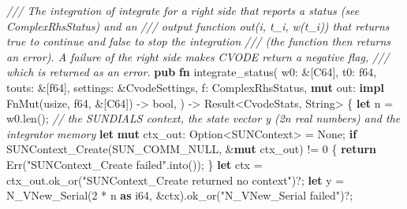 \documentclass[
  10pt,
]{article}
\newenvironment{Shaded}{}{}
\newcommand{\BuiltInTok}[1]{\textcolor[rgb]{0.00,0.50,0.00}{#1}}
\newcommand{\CommentTok}[1]{\textcolor[rgb]{0.38,0.63,0.69}{\textit{#1}}}
\newcommand{\ConstantTok}[1]{\textcolor[rgb]{0.53,0.00,0.00}{#1}}
\newcommand{\ControlFlowTok}[1]{\textcolor[rgb]{0.00,0.44,0.13}{\textbf{#1}}}
\newcommand{\DataTypeTok}[1]{\textcolor[rgb]{0.56,0.13,0.00}{#1}}
\newcommand{\DecValTok}[1]{\textcolor[rgb]{0.25,0.63,0.44}{#1}}
\newcommand{\KeywordTok}[1]{\textcolor[rgb]{0.00,0.44,0.13}{\textbf{#1}}}
\newcommand{\NormalTok}[1]{#1}
\newcommand{\OperatorTok}[1]{\textcolor[rgb]{0.40,0.40,0.40}{#1}}
\newcommand{\StringTok}[1]{\textcolor[rgb]{0.25,0.44,0.63}{#1}}
\begin{document}
\begin{Shaded}
\begin{Highlighting}[]
\CommentTok{/// The integration of \textasciigrave{}integrate\textasciigrave{} for a right side that reports a status (see \textasciigrave{}ComplexRhsStatus\textasciigrave{}) and an}
\CommentTok{/// output function \textasciigrave{}out(i, t\_i, w(t\_i))\textasciigrave{} that returns true to continue and false to stop the integration}
\CommentTok{/// (the function then returns an error).  A failure of the right side makes CVODE return a negative flag,}
\CommentTok{/// which is returned as an error.}
\KeywordTok{pub} \KeywordTok{fn}\NormalTok{ integrate\_status(}
\NormalTok{    w0}\OperatorTok{:} \OperatorTok{\&}\NormalTok{[C64]}\OperatorTok{,}
\NormalTok{    t0}\OperatorTok{:} \DataTypeTok{f64}\OperatorTok{,}
\NormalTok{    touts}\OperatorTok{:} \OperatorTok{\&}\NormalTok{[}\DataTypeTok{f64}\NormalTok{]}\OperatorTok{,}
\NormalTok{    settings}\OperatorTok{:} \OperatorTok{\&}\NormalTok{CvodeSettings}\OperatorTok{,}
\NormalTok{    f}\OperatorTok{:}\NormalTok{ ComplexRhsStatus}\OperatorTok{,}
    \KeywordTok{mut}\NormalTok{ out}\OperatorTok{:} \KeywordTok{impl} \BuiltInTok{FnMut}\NormalTok{(}\DataTypeTok{usize}\OperatorTok{,} \DataTypeTok{f64}\OperatorTok{,} \OperatorTok{\&}\NormalTok{[C64]) }\OperatorTok{{-}\textgreater{}} \DataTypeTok{bool}\OperatorTok{,}
\NormalTok{) }\OperatorTok{{-}\textgreater{}} \DataTypeTok{Result}\OperatorTok{\textless{}}\NormalTok{CvodeStats}\OperatorTok{,} \DataTypeTok{String}\OperatorTok{\textgreater{}} \OperatorTok{\{}
    \KeywordTok{let}\NormalTok{ n }\OperatorTok{=}\NormalTok{ w0}\OperatorTok{.}\NormalTok{len()}\OperatorTok{;}
    \CommentTok{// the SUNDIALS context, the state vector y (2n real numbers) and the integrator memory}
    \KeywordTok{let} \KeywordTok{mut}\NormalTok{ ctx\_out}\OperatorTok{:} \DataTypeTok{Option}\OperatorTok{\textless{}}\NormalTok{SUNContext}\OperatorTok{\textgreater{}} \OperatorTok{=} \ConstantTok{None}\OperatorTok{;}
    \ControlFlowTok{if}\NormalTok{ SUNContext\_Create(SUN\_COMM\_NULL}\OperatorTok{,} \OperatorTok{\&}\KeywordTok{mut}\NormalTok{ ctx\_out) }\OperatorTok{!=} \DecValTok{0} \OperatorTok{\{}
        \ControlFlowTok{return} \ConstantTok{Err}\NormalTok{(}\StringTok{"SUNContext\_Create failed"}\OperatorTok{.}\NormalTok{into())}\OperatorTok{;}
    \OperatorTok{\}}
    \KeywordTok{let}\NormalTok{ ctx }\OperatorTok{=}\NormalTok{ ctx\_out}\OperatorTok{.}\NormalTok{ok\_or(}\StringTok{"SUNContext\_Create returned no context"}\NormalTok{)}\OperatorTok{?;}
    \KeywordTok{let}\NormalTok{ y }\OperatorTok{=}\NormalTok{ N\_VNew\_Serial(}\DecValTok{2} \OperatorTok{*}\NormalTok{ n }\KeywordTok{as} \DataTypeTok{i64}\OperatorTok{,} \OperatorTok{\&}\NormalTok{ctx)}\OperatorTok{.}\NormalTok{ok\_or(}\StringTok{"N\_VNew\_Serial failed"}\NormalTok{)}\OperatorTok{?;}

\end{Highlighting}
\end{Shaded}
\end{document}
